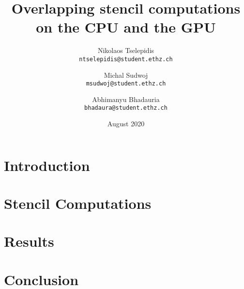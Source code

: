 \documentclass[twocolumn]{article}
\title{Overlapping stencil computations on the CPU and the GPU}
\author{
Nikolaos Tselepidis \\
\small{\texttt{ntselepidis@student.ethz.ch}}
    \and
Michal Sudwoj \\
\small{\texttt{msudwoj@student.ethz.ch}}
    \and
Abhimanyu Bhadauria \\
\small{\texttt{bhadaura@student.ethz.ch}}
}
\date{August 2020}
\begin{document}
\twocolumn[
  \begin{@twocolumnfalse}
    \maketitle
    \begin{abstract}
        \vspace{0.2cm}
        
        \vspace{0.8cm}
    \end{abstract}
\end{@twocolumnfalse}]


\section{Introduction} \label{sec:intro}


\section{Stencil Computations} \label{sec:stencil}


\section{Results} \label{sec:results}


\section{Conclusion} \label{sec:conclusion}


\pagebreak

{\small


}
\end{document}
